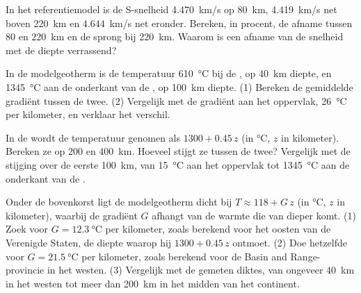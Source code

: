 \begin{exercise}[$\star\star$]\label{exo:g11:lithosphere-asthenosphere:9}
In het referentiemodel is de S-snelheid \qty{4.470}{km/s} op \qty{80}{km},
\qty{4.419}{km/s} net boven \qty{220}{km} en \qty{4.644}{km/s} net eronder.
Bereken, in procent, de afname tussen 80 en \qty{220}{km} en de sprong
bij \qty{220}{km}. Waarom is een afname van de snelheid met de diepte verrassend?
\end{exercise}

\begin{exercise}[$\star\star$]\label{exo:g11:lithosphere-asthenosphere:10}
In de modelgeotherm is de temperatuur \qty{610}{\celsius} bij de , op
\qty{40}{km} diepte, en \qty{1345}{\celsius} aan de onderkant van de ,
op \qty{100}{km} diepte. (1) Bereken de gemiddelde gradiënt tussen de twee. (2)
Vergelijk met de gradiënt aan het oppervlak, \qty{26}{\celsius} per kilometer,
en verklaar het verschil.
\end{exercise}

\begin{exercise}[$\star\star$]\label{exo:g11:lithosphere-asthenosphere:11}
In de  wordt de temperatuur genomen als $1300 + 0.45\,z$ (in
\unit{\celsius}, $z$ in kilometer). Bereken ze op 200 en \qty{400}{km}. Hoeveel
stijgt ze tussen de twee? Vergelijk met de stijging over de eerste
\qty{100}{km}, van \qty{15}{\celsius} aan het oppervlak tot
\qty{1345}{\celsius} aan de onderkant van de .
\end{exercise}

\begin{exercise}[$\star\star\star$]\label{exo:g11:lithosphere-asthenosphere:12}
Onder de bovenkorst ligt de modelgeotherm dicht bij $T \approx 118 +
G\,z$ (in \unit{\celsius}, $z$ in kilometer), waarbij de gradiënt $G$ afhangt
van de warmte die van dieper komt. (1) Zoek voor $G =
\qty{12.3}{\celsius}$ per kilometer, zoals berekend voor het oosten van de
Verenigde Staten, de diepte waarop hij $1300 + 0.45\,z$ ontmoet. (2) Doe hetzelfde
voor $G = \qty{21.5}{\celsius}$ per kilometer, zoals berekend voor de Basin and
Range-provincie in het westen. (3) Vergelijk met de gemeten diktes, van ongeveer
\qty{40}{km} in het westen tot meer dan \qty{200}{km} in het midden van het
continent.
\end{exercise}

